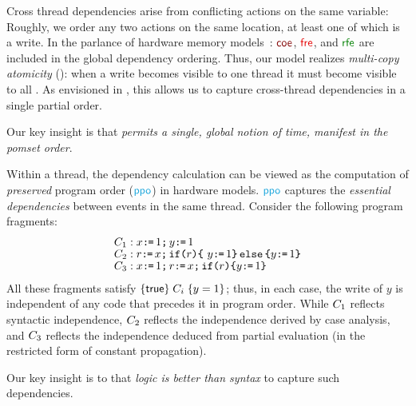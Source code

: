 Cross thread dependencies arise from conflicting actions on the same
variable: Roughly, we order any two actions on the same location, at least
one of which is a write.  In the parlance of hardware memory
models~\citep{alglave}: $\rcoe$, $\rfre$, and $\rrfex$ are included in the
global dependency ordering.  Thus, our model realizes \emph{multi-copy
  atomicity} (\mca): when a write becomes visible to one thread it must
become visible to all
\citep{DBLP:journals/pacmpl/PulteFDFSS18}.  As envisioned in
\cite[]{AlglaveThesis}, this allows us to capture cross-thread
dependencies in a single partial order.

Our key insight is that \emph{\mca{} permits a single, global notion of time,
  manifest in the pomset order}.
  

Within a thread, the dependency calculation can be viewed as the computation
of \emph{preserved} program order ($\rppo$) in hardware models.  $\rppo$
captures the \emph{essential dependencies} between events in the same thread.
Consider the following program fragments: \begingroup \allowdisplaybreaks
\begin{align*}
  & C_1: x \texttt{:}\mkern-1mu\texttt{=}\, 1 \texttt{;}\,\allowbreak y \texttt{:}\mkern-1mu\texttt{=}\, 1
  \\[-1ex] & C_2: r \texttt{:}\mkern-1mu\texttt{=}\, x \texttt{;}\,\allowbreak \texttt{if}\allowbreak\texttt{(}r\texttt{)} \allowbreak\texttt{\{}\ y \texttt{:}\mkern-1mu\texttt{=}\, 1 \texttt{\}}\,\allowbreak\texttt{else}\allowbreak\,\texttt{\{} y \texttt{:}\mkern-1mu\texttt{=}\, 1  \texttt{\}}
  \\[-1ex] & C_3: x \texttt{:}\mkern-1mu\texttt{=}\, 1 \texttt{;}\,\allowbreak r \texttt{:}\mkern-1mu\texttt{=}\, x \texttt{;}\,\allowbreak \texttt{if}\allowbreak\texttt{(}r\texttt{)} \allowbreak\texttt{\{} y \texttt{:}\mkern-1mu\texttt{=}\, 1 \texttt{\}}
\end{align*}
\endgroup
All these fragments satisfy $\{\mathsf{true}\}\allowbreak\;C_i\;\allowbreak\{y =1\}$; thus, in each
case, the write of $y$ is independent of any code that precedes it in program
order. While $C_1$ reflects syntactic independence, $C_2$ reflects
the independence derived by case analysis, and $C_3$ reflects the
independence deduced from partial evaluation (in the restricted form of
constant propagation).

Our key insight is to that \emph{logic is better than syntax} to capture such
dependencies.

